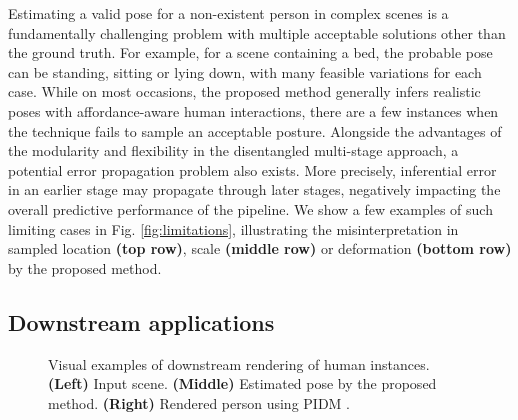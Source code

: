 Estimating a valid pose for a non-existent person in complex scenes is a fundamentally challenging problem with multiple acceptable solutions other than the ground truth. For example, for a scene containing a bed, the probable pose can be standing, sitting or lying down, with many feasible variations for each case. While on most occasions, the proposed method generally infers realistic poses with affordance-aware human interactions, there are a few instances when the technique fails to sample an acceptable posture. Alongside the advantages of the modularity and flexibility in the disentangled multi-stage approach, a potential error propagation problem also exists. More precisely, inferential error in an earlier stage may propagate through later stages, negatively impacting the overall predictive performance of the pipeline. We show a few examples of such limiting cases in Fig. \ref{fig:limitations}, illustrating the misinterpretation in sampled location \textbf{(top row)}, scale \textbf{(middle row)} or deformation \textbf{(bottom row)} by the proposed method.

\subsection{Downstream applications}
\label{sec:experiments_applications}

\begin{figure}[t]
\centering
\captionsetup[subfloat]{labelfont=bf}
\hfil
{}\hfil
{}
\vspace{-0.75em}
\hfil
{}\hfil
{}
\vspace{-0.75em}
\hfil
{}\hfil
{}
\caption{Visual examples of downstream rendering of human instances. \textbf{(Left)} Input scene. \textbf{(Middle)} Estimated pose by the proposed method. \textbf{(Right)} Rendered person using PIDM \cite{bhunia2023person}.}
\label{fig:rendering}
\end{figure}

